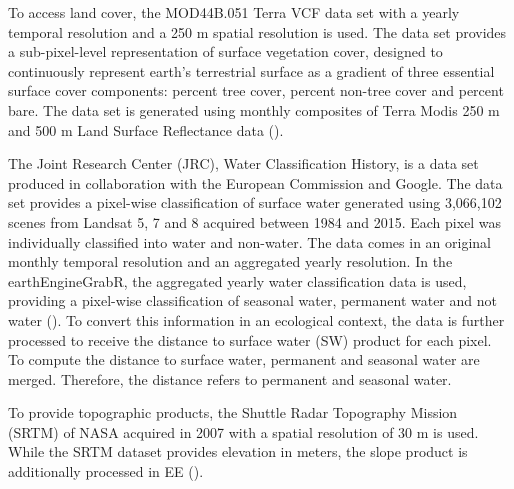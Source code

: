 To access land cover, the MOD44B.051 Terra VCF data set with a yearly temporal resolution and a 250 m spatial resolution is used. The data set provides a sub-pixel-level representation of surface vegetation cover, designed to continuously represent earth's terrestrial surface as a gradient of three essential surface cover components: percent tree cover, percent non-tree cover and percent bare. The data set is generated using monthly composites of Terra Modis 250 m and 500 m Land Surface Reflectance data (\cite{hansen2006vegetation}).

The Joint Research Center (JRC), Water Classification History, is a data set produced in collaboration with the European Commission and Google. 
The data set provides a pixel-wise classification of surface water generated using 3,066,102 scenes from Landsat 5, 7 and 8 acquired between 1984 and 2015. Each pixel was individually classified into water and non-water. The data comes in an original monthly temporal resolution and an aggregated yearly resolution. In the earthEngineGrabR, the aggregated yearly water classification data is used, providing a pixel-wise classification of seasonal water, permanent water and not water (\cite{pekel2016high}). To convert this information in an ecological context, the data is further processed to receive the distance to surface water (SW) product for each pixel. To compute the distance to surface water, permanent and seasonal water are merged. Therefore, the distance refers to permanent and seasonal water.

To provide topographic products, the Shuttle Radar Topography Mission (SRTM) of NASA acquired in 2007 with a spatial resolution of 30 m is used. While the SRTM dataset provides elevation in meters, the slope product is additionally processed in EE (\cite{farr2007shuttle}). 

